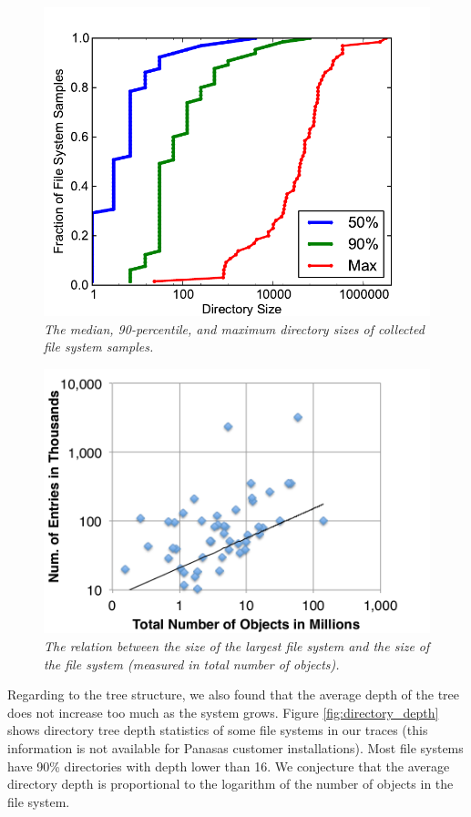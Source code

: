 \begin{figure}[hb]
\center
\includegraphics[scale=0.5]{figs/directory_size}
\caption{\textit{The median, 90-percentile,
and maximum directory sizes of collected file system samples.
}}
\label{fig:directory_size}
\end{figure}

\begin{figure}[!ht]
\center
\includegraphics[scale=0.4]{figs/large_dir}
\caption{\textit{The relation between the size of the largest file system
and the size of the file system (measured in total number of objects).}}
\label{fig:large_directory}
\end{figure}

Regarding to the tree structure, we also found that the average depth
of the tree does not increase too much as the system grows.
Figure \ref{fig:directory_depth} shows directory tree
depth statistics of some file systems in our traces
(this information is not available for Panasas customer installations).
Most file systems have 90\% directories with depth lower than 16.
We conjecture that the average directory depth is proportional to
the logarithm of the number of objects in the file system.


